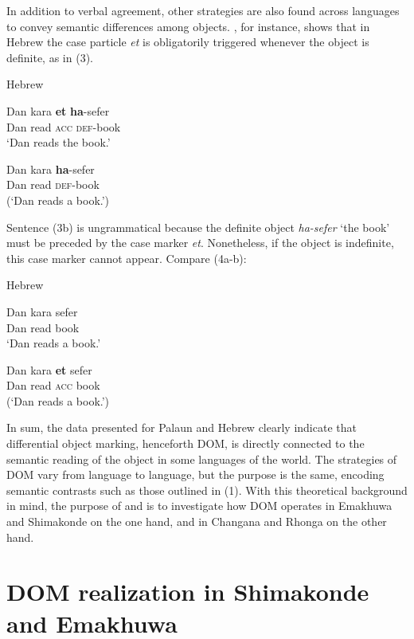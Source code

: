 \documentclass[output=paper]{langsci/langscibook}
\begin{document}
In addition to verbal agreement, other strategies are also found across languages to convey semantic differences among objects. \citet{Danon2002}, for instance, shows that in Hebrew the case particle {\textit{et}} is obligatorily triggered whenever the object is definite, as in (3).

{Hebrew \citep[1]{Danon2002}}

\ea
\gll Dan       kara       \textbf{et}       \textbf{ha}{}-sefer\\
     Dan       read       {\textsc{acc     def}}{}-book\\
\glt ‘Dan reads the book.’
\z

\ea
\gll *Dan       kara              \textbf{ha}{}-sefer\\
     Dan         read              \textsc{def}{}-book\\
\glt (‘Dan reads a book.’)
\z



Sentence (3b) is ungrammatical because the definite object {\textit{ha-sefer}} ‘the book’ must be preceded by the case marker {\textit{et}}. Nonetheless, if the object is indefinite, this case marker cannot appear. Compare (4a-b):

{Hebrew \citep[1]{Danon2002}}

\ea
\gll Dan         kara                 sefer\\
     Dan         read                  book\\
\glt ‘Dan reads a book.’
\z

\ea
\gll *Dan        kara        \textbf{et}      sefer\\
     Dan          read        {\textsc{acc}}   {}book\\
\glt (‘Dan reads a book.’)
\z

In sum, the data presented for Palaun and Hebrew clearly indicate that differential object marking, henceforth DOM, is directly connected to the semantic reading of the object in some languages of the world. The strategies of DOM vary from language to language, but the purpose is the same, encoding semantic contrasts such as those outlined in (1). With this theoretical background in mind, the purpose of  and  is to investigate how DOM operates in Emakhuwa and Shimakonde on the one hand, and in Changana and Rhonga on the other hand.

\section{DOM realization in Shimakonde and Emakhuwa}
\end{document}
